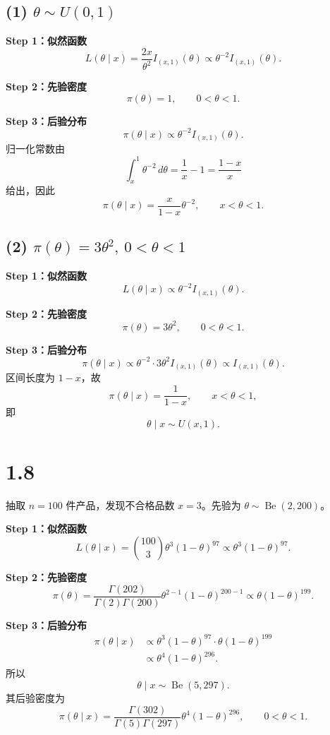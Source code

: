 \documentclass[UTF8,zihao=-4]{ctexart}
\begin{document}
\subsection*{(1) \(\theta\sim U(0,1)\)}
\textbf{Step 1：似然函数}
\[
L(\theta\mid x)=\frac{2x}{\theta^2}I_{(x,1)}(\theta)
\propto\theta^{-2}I_{(x,1)}(\theta).
\]

\textbf{Step 2：先验密度}
\[
\pi(\theta)=1,\qquad0<\theta<1.
\]

\textbf{Step 3：后验分布}
\[
\pi(\theta\mid x)\propto\theta^{-2}I_{(x,1)}(\theta).
\]
归一化常数由
\[
\int_x^1\theta^{-2}\,d\theta=\frac1x-1=\frac{1-x}{x}
\]
给出，因此
\[
\boxed{\pi(\theta\mid x)=\frac{x}{1-x}\theta^{-2},\qquad x<\theta<1.}
\]

\subsection*{(2) \(\pi(\theta)=3\theta^2,\ 0<\theta<1\)}
\textbf{Step 1：似然函数}
\[
L(\theta\mid x)\propto\theta^{-2}I_{(x,1)}(\theta).
\]

\textbf{Step 2：先验密度}
\[
\pi(\theta)=3\theta^2,\qquad0<\theta<1.
\]

\textbf{Step 3：后验分布}
\[
\pi(\theta\mid x)\propto\theta^{-2}\cdot3\theta^2I_{(x,1)}(\theta)
\propto I_{(x,1)}(\theta).
\]
区间长度为 \(1-x\)，故
\[
\boxed{\pi(\theta\mid x)=\frac1{1-x},\qquad x<\theta<1,}
\]
即
\[
\boxed{\theta\mid x\sim U(x,1).}
\]

\section*{1.8}
抽取 \(n=100\) 件产品，发现不合格品数 \(x=3\)。先验为 \(\theta\sim\operatorname{Be}(2,200)\)。

\textbf{Step 1：似然函数}
\[
L(\theta\mid x)={100\choose3}\theta^3(1-\theta)^{97}
\propto\theta^3(1-\theta)^{97}.
\]

\textbf{Step 2：先验密度}
\[
\pi(\theta)=\frac{\Gamma(202)}{\Gamma(2)\Gamma(200)}
\theta^{2-1}(1-\theta)^{200-1}
\propto\theta(1-\theta)^{199}.
\]

\textbf{Step 3：后验分布}
\[
\begin{aligned}
\pi(\theta\mid x)&\propto\theta^3(1-\theta)^{97}
\cdot\theta(1-\theta)^{199}\\
&\propto\theta^4(1-\theta)^{296}.
\end{aligned}
\]
所以
\[
\boxed{\theta\mid x\sim\operatorname{Be}(5,297).}
\]
其后验密度为
\[
\boxed{\pi(\theta\mid x)=\frac{\Gamma(302)}{\Gamma(5)\Gamma(297)}
\theta^4(1-\theta)^{296},\qquad0<\theta<1.}
\]
\end{document}
